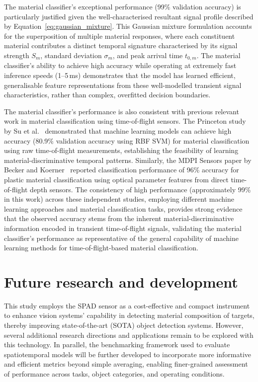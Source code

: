 \documentclass[12pt,a4paper,oneside]{report}
\let\oldsection\section
\renewcommand{\section}{\clearpage\oldsection}
\begin{document}
The material classifier's exceptional performance (99\% validation accuracy) is particularly justified given the well-characterised resultant signal profile described by Equation~\eqref{eq:gaussian_mixture}. This Gaussian mixture formulation accounts for the superposition of multiple material responses, where each constituent material contributes a distinct temporal signature characterised by its signal strength $S_m$, standard deviation $\sigma_m$, and peak arrival time $t_{0,m}$. The material classifier's ability to achieve high accuracy while operating at extremely fast inference speeds (1--5\,ms) demonstrates that the model has learned efficient, generalisable feature representations from these well-modelled transient signal characteristics, rather than complex, overfitted decision boundaries.

The material classifier's performance is also consistent with previous relevant work in material classification using time-of-flight sensors. The Princeton study by Su et al.~\cite{su2016} demonstrated that machine learning models can achieve high accuracy (80.9\% validation accuracy using RBF SVM) for material classification using raw time-of-flight measurements, establishing the feasibility of learning material-discriminative temporal patterns. Similarly, the MDPI Sensors paper by Becker and Koerner~\cite{becker2023} reported classification performance of 96\% accuracy for plastic material classification using optical parameter features from direct time-of-flight depth sensors. The consistency of high performance (approximately 99\% in this work) across these independent studies, employing different machine learning approaches and material classification tasks, provides strong evidence that the observed accuracy stems from the inherent material-discriminative information encoded in transient time-of-flight signals, validating the material classifier's performance as representative of the general capability of machine learning methods for time-of-flight-based material classification.

\newpage
\section{Future research and development}
\label{sec:future_research_development}

This study employs the SPAD sensor as a cost-effective and compact instrument to enhance vision systems' capability in detecting material composition of targets, thereby improving state-of-the-art (SOTA) object detection systems. However, several additional research directions and applications remain to be explored with this technology. In parallel, the benchmarking framework used to evaluate spatiotemporal models will be further developed to incorporate more informative and efficient metrics beyond simple averaging, enabling finer-grained assessment of performance across tasks, object categories, and operating conditions.
\end{document}
